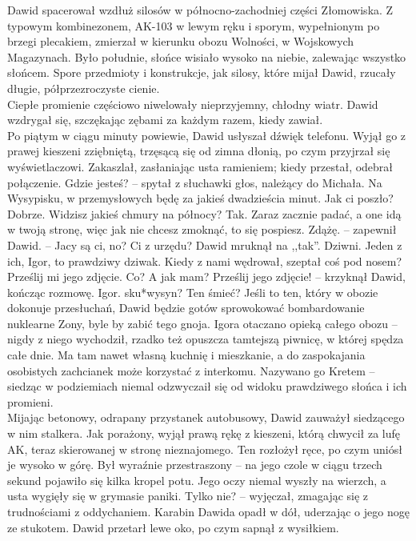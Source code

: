\documentclass[../MAIN.tex]{subfiles}
\begin{document}
Dawid spacerował wzdłuż silosów w północno-zachodniej części Złomowiska. Z typowym kombinezonem, AK-103 w lewym ręku i sporym, wypełnionym po brzegi plecakiem, zmierzał w kierunku obozu Wolności, w Wojskowych Magazynach. Było południe, słońce wisiało wysoko na niebie, zalewając wszystko słońcem. Spore przedmioty i konstrukcje, jak silosy, które mijał Dawid, rzucały długie, półprzezroczyste cienie.\\
Ciepłe promienie częściowo niwelowały nieprzyjemny, chłodny wiatr. Dawid wzdrygał się, szczękając zębami za każdym razem, kiedy zawiał.\\
Po piątym w ciągu minuty powiewie, Dawid usłyszał dźwięk telefonu. Wyjął go z prawej kieszeni zziębniętą, trzęsącą się od zimna dłonią, po czym przyjrzał się wyświetlaczowi. Zakaszlał, zasłaniając usta ramieniem; kiedy przestał, odebrał połączenie.
\sx Gdzie jesteś? -- spytał z słuchawki głos, należący do Michała.
\xx Na Wysypisku, w przemysłowych będę za jakieś dwadzieścia minut. Jak ci poszło?
\xx Dobrze. Widzisz jakieś chmury na północy?
\xx Tak.
\xx Zaraz zacznie padać, a one idą w twoją stronę, więc jak nie chcesz zmoknąć, to się pospiesz.
\xx Zdążę. -- zapewnił Dawid. -- Jacy są ci, no?
\xx Ci z urzędu?
\qd
Dawid mruknął na ,,tak''.
\sx Dziwni. Jeden z ich, Igor, to prawdziwy dziwak. Kiedy z nami wędrował, szeptał coś pod nosem?
\xx Prześlij mi jego zdjęcie.
\xx Co? A jak mam?
\xx Prześlij jego zdjęcie! -- krzyknął Dawid, kończąc rozmowę. Igor. sku*wysyn? Ten śmieć? 
\qd
Jeśli to ten, który w obozie dokonuje przesłuchań, Dawid będzie gotów sprowokować bombardowanie nuklearne Zony, byle by zabić tego gnoja. Igora otaczano opieką całego obozu -- nigdy z niego wychodził, rzadko też opuszcza tamtejszą piwnicę, w której spędza całe dnie. Ma tam nawet własną kuchnię i mieszkanie, a do zaspokajania osobistych zachcianek może korzystać z interkomu. Nazywano go Kretem -- siedząc w podziemiach niemal odzwyczaił się od widoku prawdziwego słońca i ich promieni.\\
Mijając betonowy, odrapany przystanek autobusowy, Dawid zauważył siedzącego w nim stalkera.
Jak porażony, wyjął prawą rękę z kieszeni, którą chwycił za lufę AK, teraz skierowanej w stronę nieznajomego. Ten rozłożył ręce, po czym uniósł je wysoko w górę. Był wyraźnie przestraszony -- na jego czole w ciągu trzech sekund pojawiło się kilka kropel potu. Jego oczy niemal wyszły na wierzch, a usta wygięły się w grymasie paniki.
\sx Tylko nie? -- wyjęczał, zmagając się z trudnościami z oddychaniem.
\qd
Karabin Dawida opadł w dół, uderzając o jego nogę ze stukotem. Dawid przetarł lewe oko, po czym sapnął z wysiłkiem.
\end{document}
